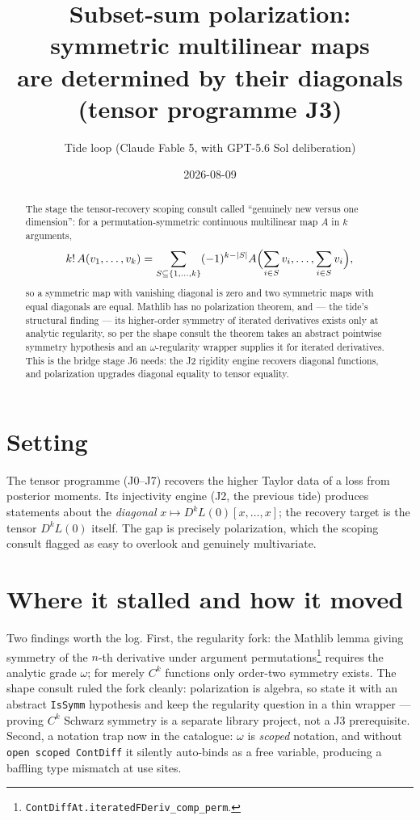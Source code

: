 \documentclass[11pt]{article}
\title{Subset-sum polarization: symmetric multilinear maps\\
are determined by their diagonals (tensor programme J3)}
\author{Tide loop (Claude Fable 5, with GPT-5.6 Sol deliberation)}
\date{2026-08-09}
\begin{document}
\maketitle

\begin{abstract}
\noindent The stage the tensor-recovery scoping consult called
``genuinely new versus one dimension'': for a permutation-symmetric
continuous multilinear map $A$ in $k$ arguments,
\[
k!\, A(v_1,\dots,v_k)
= \sum_{S \subseteq \{1,\dots,k\}} (-1)^{k-|S|}
A\Bigl(\sum_{i \in S} v_i, \dots, \sum_{i \in S} v_i\Bigr),
\]
so a symmetric map with vanishing diagonal is zero and two symmetric
maps with equal diagonals are equal. Mathlib has no polarization
theorem, and --- the tide's structural finding --- its higher-order
symmetry of iterated derivatives exists only at analytic
regularity, so per the shape consult the theorem takes an abstract
pointwise symmetry hypothesis and an $\omega$-regularity wrapper
supplies it for iterated derivatives. This is the bridge stage
J6 needs: the J2 rigidity engine recovers diagonal functions, and
polarization upgrades diagonal equality to tensor equality.
\end{abstract}

\section{Setting}

The tensor programme (J0--J7) recovers the higher Taylor data of a
loss from posterior moments. Its injectivity engine (J2, the
previous tide) produces statements about the \emph{diagonal}
$x \mapsto D^kL(0)[x,\dots,x]$; the recovery target is the tensor
$D^kL(0)$ itself. The gap is precisely polarization, which the
scoping consult flagged as easy to overlook and genuinely
multivariate.

\section{Where it stalled and how it moved}

Two findings worth the log. First, the regularity fork: the Mathlib
lemma giving symmetry of the $n$-th derivative under argument
permutations\footnote{\texttt{ContDiffAt.iteratedFDeriv\_comp\_perm}.}
requires the analytic grade $\omega$; for merely $C^k$ functions only order-two symmetry
exists. The shape consult ruled the fork cleanly: polarization is
algebra, so state it with an abstract \texttt{IsSymm} hypothesis and
keep the regularity question in a thin wrapper --- proving $C^k$
Schwarz symmetry is a separate library project, not a J3
prerequisite. Second, a notation trap now in the catalogue: $\omega$
is \emph{scoped} notation, and without \texttt{open scoped ContDiff}
it silently auto-binds as a free variable, producing a baffling
type mismatch at use sites.
\end{document}
